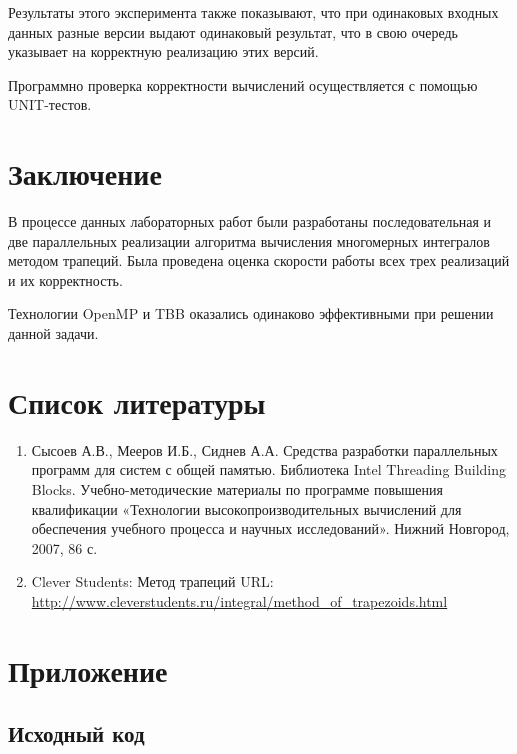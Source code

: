 \documentclass{report}
\begin{document}
    \par Результаты этого эксперимента также показывают, что при одинаковых входных данных разные версии выдают одинаковый результат, что в свою очередь указывает на корректную реализацию этих версий.
    \par Программно проверка корректности вычислений осуществляется с помощью UNIT-тестов.
    \newpage
    
    \section*{Заключение}
    \par В процессе данных лабораторных работ были разработаны последовательная и две параллельных реализации алгоритма вычисления многомерных интегралов методом трапеций. Была проведена оценка скорости работы всех трех реализаций и их корректность.
    \par Технологии OpenMP и TBB оказались одинаково эффективными при решении данной задачи.
    \newpage
    
    \section*{Список литературы}
    \begin{enumerate}
        \item Сысоев А.В., Мееров И.Б., Сиднев А.А. Средства разработки параллельных программ для систем с общей памятью. Библиотека Intel Threading Building Blocks. Учебно-методические материалы по программе повышения квалификации «Технологии высокопроизводительных вычислений для обеспечения учебного процесса и научных исследований». Нижний Новгород, 2007, 86 с.
        \item Clever Students: Метод трапеций URL: \url{http://www.cleverstudents.ru/integral/method_of_trapezoids.html}
    \end{enumerate}
    \newpage
    
    \section*{Приложение}
    \subsection*{Исходный код}
\end{document}

